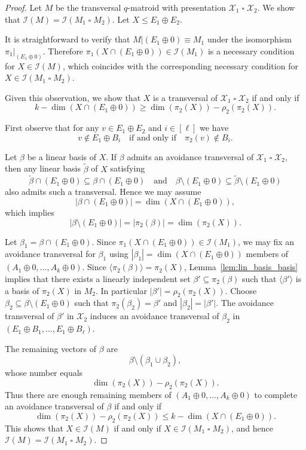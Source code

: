 \documentclass{article}
\theoremstyle{definition}
\newcommand{\sq}{\mathbin{\square}}
\begin{document}
\begin{proof}
Let $M$ be the transversal $q$-matroid with presentation $\mathcal{X}_1\sq\mathcal{X}_2$. We show that $\mathcal{I}(M)=\mathcal{I}(M_1\sq M_2)$. Let $X\le E_1\oplus E_2$.

It is straightforward to verify that $M|(E_1\oplus0)\equiv M_1$ under the isomorphism $\pi_1|_{(E_1\oplus0)}$. Therefore $\pi_1(X\cap(E_1\oplus0))\in\mathcal{I}(M_1)$ is a necessary condition for $X\in\mathcal{I}(M)$, which coincides with the corresponding necessary condition for $X\in\mathcal{I}(M_1\sq M_2)$.

Given this observation, we show that $X$ is a transversal of $\mathcal{X}_1\sq\mathcal{X}_2$ if and only if
\[
k-\dim(X\cap(E_1\oplus0))
\ge
\dim(\pi_2(X))-\rho_2(\pi_2(X)).
\]

First observe that for any $v\in E_1\oplus E_2$ and $i\in[\ell]$ we have
\[
v\notin E_1\oplus B_i
\quad\text{if and only if}\quad
\pi_2(v)\notin B_i.
\]

Let $\beta$ be a linear basis of $X$. If $\beta$ admits an avoidance transversal of $\mathcal{X}_1\sq\mathcal{X}_2$, then any linear basis $\tilde{\beta}$ of $X$ satisfying
\[
\tilde{\beta}\cap(E_1\oplus0)\subseteq\beta\cap(E_1\oplus0)
\quad\text{and}\quad
\beta\setminus(E_1\oplus0)\subseteq\tilde{\beta}\setminus(E_1\oplus0)
\]
also admits such a transversal. Hence we may assume
\[
|\beta\cap(E_1\oplus0)|=\dim(X\cap(E_1\oplus0)),
\]
which implies
\[
|\beta\setminus(E_1\oplus0)|=|\pi_2(\beta)|=\dim(\pi_2(X)).
\]

Let $\beta_1=\beta\cap(E_1\oplus0)$. Since $\pi_1(X\cap(E_1\oplus0))\in\mathcal{I}(M_1)$, we may fix an avoidance transversal for $\beta_1$ using $|\beta_1|=\dim(X\cap(E_1\oplus0))$ members of $(A_1\oplus0,\dots,A_k\oplus0)$.
Since $\langle\pi_2(\beta)\rangle=\pi_2(X)$, Lemma~\ref{lem:lin_basis_basis} implies that there exists a linearly independent set $\beta'\subseteq\pi_2(\beta)$ such that $\langle\beta'\rangle$ is a basis of $\pi_2(X)$ in $M_2$. In particular $|\beta'|=\rho_2(\pi_2(X))$.
Choose $\beta_2\subseteq\beta\setminus(E_1\oplus0)$ such that $\pi_2(\beta_2)=\beta'$ and $|\beta_2|=|\beta'|$. The avoidance transversal of $\beta'$ in $\mathcal{X}_2$ induces an avoidance transversal of $\beta_2$ in $(E_1\oplus B_1,\dots,E_1\oplus B_\ell)$.

The remaining vectors of $\beta$ are
\[
\beta\setminus(\beta_1\cup\beta_2),
\]
whose number equals
\[
\dim(\pi_2(X))-\rho_2(\pi_2(X)).
\]
Thus there are enough remaining members of $(A_1\oplus0,\dots,A_k\oplus0)$ to complete an avoidance transversal of $\beta$ if and only if
\[
\dim(\pi_2(X))-\rho_2(\pi_2(X))
\le
k-\dim(X\cap(E_1\oplus0)).
\]
This shows that $X\in\mathcal{I}(M)$ if and only if $X\in\mathcal{I}(M_1\sq M_2)$, and hence $\mathcal{I}(M)=\mathcal{I}(M_1\sq M_2)$.
\end{proof}
\end{document}
